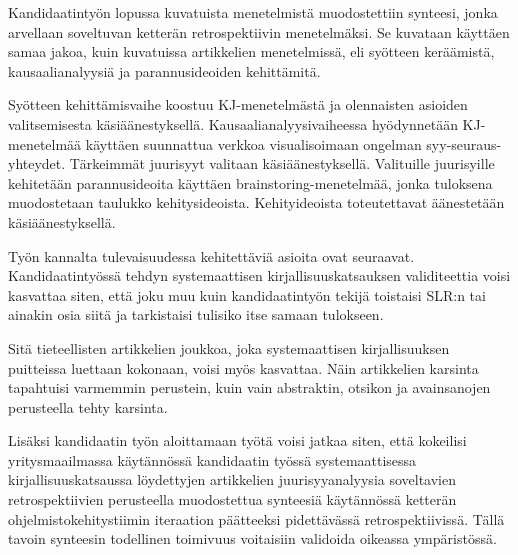 Kandidaatintyön lopussa kuvatuista menetelmistä muodostettiin synteesi, jonka arvellaan soveltuvan ketterän retrospektiivin menetelmäksi. Se kuvataan käyttäen samaa jakoa, kuin kuvatuissa artikkelien menetelmissä, eli syötteen keräämistä, kausaalianalyysiä ja parannusideoiden kehittämitä.
 
Syötteen kehittämisvaihe koostuu KJ-menetelmästä ja olennaisten asioiden valitsemisesta käsiäänestyksellä. Kausaalianalyysivaiheessa hyödynnetään KJ-menetelmää käyttäen suunnattua verkkoa visualisoimaan ongelman syy-seuraus-yhteydet. Tärkeimmät juurisyyt valitaan käsiäänestyksellä. Valituille juurisyille kehitetään parannusideoita käyttäen brainstoring-menetelmää, jonka tuloksena muodostetaan taulukko kehitysideoista. Kehityideoista toteutettavat äänestetään käsiäänestyksellä.

Työn kannalta tulevaisuudessa kehitettäviä asioita ovat seuraavat. Kandidaatintyössä tehdyn systemaattisen kirjallisuuskatsauksen validiteettia voisi kasvattaa siten, että joku muu kuin kandidaatintyön tekijä toistaisi SLR:n tai ainakin osia siitä ja tarkistaisi tulisiko itse samaan tulokseen.

Sitä tieteellisten artikkelien joukkoa, joka systemaattisen kirjallisuuksen puitteissa luettaan kokonaan, voisi myös kasvattaa. Näin artikkelien karsinta tapahtuisi varmemmin perustein, kuin vain abstraktin, otsikon ja avainsanojen perusteella tehty karsinta.

Lisäksi kandidaatin työn aloittamaan työtä voisi jatkaa siten, että kokeilisi yritysmaailmassa käytännössä kandidaatin työssä systemaattisessa kirjallisuuskatsaussa löydettyjen artikkelien juurisyyanalyysia soveltavien retrospektiivien perusteella muodostettua synteesiä käytännössä ketterän ohjelmistokehitystiimin iteraation päätteeksi pidettävässä retrospektiivissä. Tällä tavoin synteesin todellinen toimivuus voitaisiin validoida oikeassa ympäristössä.